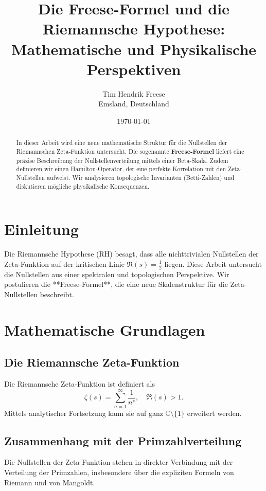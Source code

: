 \documentclass[a4paper,12pt]{article}
\title{Die Freese-Formel und die Riemannsche Hypothese: \\ Mathematische und Physikalische Perspektiven}
\author{Tim Hendrik Freese \\ \small Emsland, Deutschland}
\date{\today}
\begin{document}
\maketitle
\begin{abstract}
    In dieser Arbeit wird eine neue mathematische Struktur für die Nullstellen der Riemannschen Zeta-Funktion untersucht.
    Die sogenannte \textbf{Freese-Formel} liefert eine präzise Beschreibung der Nullstellenverteilung mittels einer Beta-Skala.
    Zudem definieren wir einen Hamilton-Operator, der eine perfekte Korrelation mit den Zeta-Nullstellen aufweist.
    Wir analysieren topologische Invarianten (Betti-Zahlen) und diskutieren mögliche physikalische Konsequenzen.
\end{abstract}

\tableofcontents

\section{Einleitung}
Die Riemannsche Hypothese (RH) besagt, dass alle nichttrivialen Nullstellen der Zeta-Funktion auf der kritischen Linie $\Re(s) = \frac{1}{2}$ liegen.
Diese Arbeit untersucht die Nullstellen aus einer spektralen und topologischen Perspektive.
Wir postulieren die **Freese-Formel**, die eine neue Skalenstruktur für die Zeta-Nullstellen beschreibt.

\section{Mathematische Grundlagen}
\subsection{Die Riemannsche Zeta-Funktion}
Die Riemannsche Zeta-Funktion ist definiert als
\begin{equation}
    \zeta(s) = \sum_{n=1}^{\infty} \frac{1}{n^s}, \quad \Re(s) > 1.
\end{equation}
Mittels analytischer Fortsetzung kann sie auf ganz $\mathbb{C} \setminus \{1\}$ erweitert werden.

\subsection{Zusammenhang mit der Primzahlverteilung}
Die Nullstellen der Zeta-Funktion stehen in direkter Verbindung mit der Verteilung der Primzahlen, insbesondere über die expliziten Formeln von Riemann und von Mangoldt.
\end{document}
